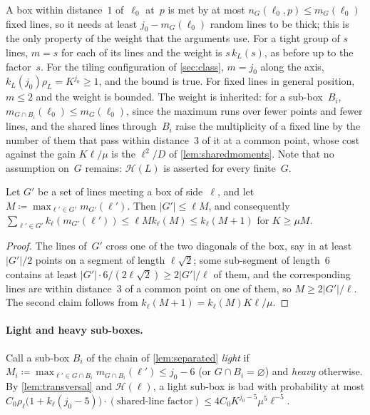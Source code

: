 \documentclass[11pt,letterpaper]{article}
\begin{document}
A box within distance~$1$ of~$\ell_0$ at~$p$ is met by at most $n_G(\ell_0,p)\le m_G(\ell_0)$ fixed lines, so it needs at least $j_0-m_G(\ell_0)$ random lines to be thick; this is the only property of the weight that the arguments use. For a tight group of $s$ lines, $m=s$ for each of its lines and the weight is $s\,k_L(s)$, as before up to the factor~$s$. For the tiling configuration of \cref{sec:class}, $m=j_0$ along the axis, $k_L(j_0)\rho_L=K^{j_0}\ge1$, and the bound is true. For fixed lines in general position, $m\le2$ and the weight is bounded. The weight is inherited: for a sub-box~$B_i$, $m_{G\cap B_i}(\ell_0)\le m_G(\ell_0)$, since the maximum runs over fewer points and fewer lines, and the shared lines through~$B_i$ raise the multiplicity of a fixed line by the number of them that pass within distance~$3$ of it at a common point, whose cost against the gain $K\ell/\mu$ is the $\ell^2/D$ of \cref{lem:sharedmoments}. Note that no assumption on~$G$ remains: $\mathcal H(L)$ is asserted for every finite~$G$.

\begin{lemma}
\label{lem:transversal}
Let $G'$ be a set of lines meeting a box of side~$\ell$, and let $M\coloneqq\max_{\ell'\in G'}m_{G'}(\ell')$. Then $\lvert G'\rvert\le\ell M$, and consequently $\sum_{\ell'\in G'}k_\ell(m_{G'}(\ell'))\le\ell Mk_\ell(M)\le k_\ell(M+1)$ for $K\ge\mu M$.
\end{lemma}

\begin{proof}
The lines of~$G'$ cross one of the two diagonals of the box, say in at least $\lvert G'\rvert/2$ points on a segment of length $\ell\sqrt2$; some sub-segment of length~$6$ contains at least $\lvert G'\rvert\cdot6/(2\ell\sqrt2)\ge2\lvert G'\rvert/\ell$ of them, and the corresponding lines are within distance~$3$ of a common point on one of them, so $M\ge2\lvert G'\rvert/\ell$. The second claim follows from $k_\ell(M+1)=k_\ell(M)K\ell/\mu$.
\end{proof}

\paragraph{Light and heavy sub-boxes.} Call a sub-box $B_i$ of the chain of \cref{lem:separated} \emph{light} if $M_i\coloneqq\max_{\ell'\in G\cap B_i}m_{G\cap B_i}(\ell')\le j_0-6$ (or $G\cap B_i=\varnothing$) and \emph{heavy} otherwise. By \cref{lem:transversal} and $\mathcal H(\ell)$, a light sub-box is bad with probability at most $C_0\rho_\ell\bigl(1+k_\ell(j_0-5)\bigr)\cdot(\text{shared-line factor})\le4C_0K^{j_0-5}\mu^5\ell^{-5}$.
\end{document}
